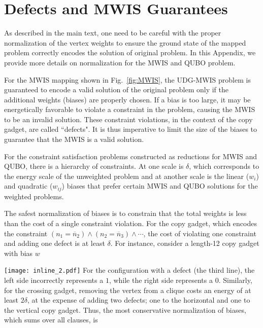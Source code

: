 \section{Defects and MWIS Guarantees}\label{sec:normalization}

As described in the main text, one need to be careful with the proper normalization of the vertex weights to ensure the ground state of the mapped problem correctly encodes the solution of original problem. In this Appendix, we provide more details on normalization for the MWIS and QUBO problem.

For the MWIS mapping shown in Fig.~\ref{fig:MWIS}, the UDG-MWIS problem is guaranteed to encode a valid solution of the original problem only if the additional weights (biases) are properly chosen. If a bias is too large, it may be energetically favorable to violate a constraint in the problem, causing the MWIS to be an invalid solution. These constraint violations, in the context of the copy gadget, are called ``defects". It is thus imperative to limit the size of the biases to guarantee that the MWIS is a valid solution.

For the constraint satisfaction problems constructed as reductions for MWIS and QUBO, there is a hierarchy of constraints. At one scale is $\delta$, which corresponds to the energy scale of the unweighted problem and at another scale is the linear ($w_i$) and quadratic ($w_{ij}$) biases that prefer certain MWIS and QUBO solutions for the weighted problems.


The safest normalization of biases is to constrain that the total weights is less than the cost of a single constraint violation. For the copy gadget, which encodes the constraint $(n_1=\overline{n}_{2})\wedge (n_2=\overline{n}_3)\wedge\cdots$, the cost of violating one constraint and adding one defect is at least $\delta$. For instance, consider a length-12 copy gadget with bias $w$

\vspace{2.5mm}
\hspace{-0.5cm}
\texttt{[image: inline\_2.pdf]}
For the configuration with a defect (the third line), the left side incorrectly represents a $1$, while the right side represents a $0$. Similarly, for the crossing gadget, removing the vertex from a clique costs an energy of at least $2\delta$, at the expense of adding two defects; one to the horizontal and one to the vertical copy gadget. Thus, the most conservative normalization of biases, which sums over all clauses, is

